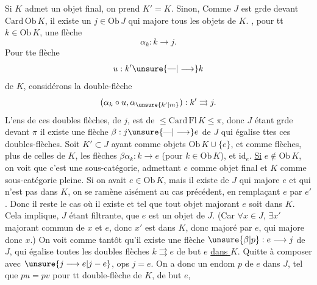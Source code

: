  Si $K$ admet un objet final, on prend $K'=K$. Sinon, Comme $J$ est grde devant $\mathrm{Card}\,\mathrm{Ob}\,K$, il existe un $j\in\mathrm{Ob}\,J$ qui majore tous les objets de $K$.  ,  pour tt $k\in\mathrm{Ob}\,K$, une flèche
\[
\alpha_k:k\longrightarrow j.
\]
Pour tte flèche
\[
u:k'\unsure{\text{---}|\longrightarrow}k
\]
de $K$, considérons la double-flèche
\[
(\alpha_k\circ u,\alpha_{\unsure{k'|m}}):k'\rightrightarrows j.
\]
L'ens de ces doubles flèches, de  $j$, est de  $\leq\mathrm{Card}\,\mathrm{Fl}\,K\leq\pi$, donc $J$ étant grde devant $\pi$ il existe une flèche $\beta:j\unsure{\text{---}|\longrightarrow}e$ de $J$ qui égalise ttes ces doubles-flèches. Soit $K'\subset J$ ayant comme objets $\mathrm{Ob}\,K\cup\{e\}$, et comme  flèches,   plus de
celles de $K$, les flèches $\beta\alpha_k:k\longrightarrow e$ (pour $k\in\mathrm{Ob}\,K$), et $\mathrm{id}_e$. \uline{Si} $e\notin\mathrm{Ob}\,K$, on voit que c'est  une sous-catégorie, admettant $e$ comme objet final et $K$ comme sous-catégorie pleine. Si on avait $e\in\mathrm{Ob}\,K$, mais il existe   de $J$ qui majore $e$ et qui n'est pas dans $K$,  on se ramène aisément au cas précédent, en remplaçant $e$ par $e'$ .
\unsure{$[\![$|$[$} Donc il reste le cas où il existe    et  tel que tout objet majorant $e$ soit dans $K$.  Cela implique, $J$ étant filtrante, que $e$ est un  objet  de $J$. (Car $\forall x\in J$, $\exists x'$ majorant commun de $x$ et $e$, donc $x'$ est dans $K$, donc majoré par $e$, qui majore donc $x$.) \unsure{=} On voit comme tantôt qu'il existe une flèche $\unsure{\beta|p}:e\longrightarrow j$ de $J$, qui égalise toutes les doubles flèches $k\rightrightarrows e$ de but $e$ \uline{dans $K$}. Quitte à composer avec $\unsure{j\longrightarrow e|j-e}$, ops $j=e$. On a donc un endom $p$ de $e$ dans $J$, tel que $pu=pv$ pour tt double-flèche   de $K$, de but $e$,
